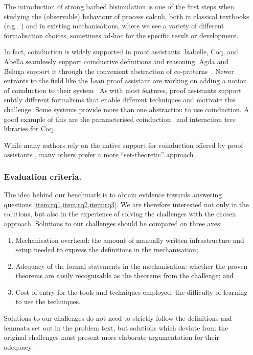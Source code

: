 \documentclass[runningheads]{llncs}
\begin{document}
The introduction of strong barbed bisimulation is one of the first
steps when studying the (observable) behaviour of process calculi,
both in classical textbooks (e.g., \cite{picalcbook}) and in existing
mechanisations, where we see a variety of different formalisation
choices, sometimes ad-hoc for the specific result or development.

In fact, coinduction is widely supported in proof assistants.
Isabelle, Coq, and Abella seamlessly support coinductive definitions and reasoning.
Agda and Beluga support it through the convenient abstraction of co-patterns~\cite{Abel2013}.
Newer entrants to the field like the Lean proof assistant
are working on adding a notion of coinduction to their system~\cite{Avigad2019}%
%
As with most features, proof assistants support
subtly different formalisms that enable different techniques and motivate this challenge.
Some systems provide more than one abstraction to use coinduction.
A good example of this are the parameterised coinduction~\cite{Hur2013}
and interaction tree~\cite{Xia2019} libraries for Coq.


While many authors rely on the native support for coinduction offered
by proof assistants
\cite{Honsell2001,Bengtson2016,Kahsai2008,Thiemann2019,Gay2020}, many
others prefer a more ``set-theoretic'' approach
\cite{Hirschkoff1997,Bengtson2009,Maksimovic2015,Pohjola2022}.

\subsubsection{Evaluation criteria.}
The idea behind our benchmark is to obtain evidence towards answering
questions \cref{item:rq1,item:rq2,item:rq3}. We are therefore
interested not only in the solutions, but also in the experience of
solving the challenges with the chosen approach.  Solutions to our
challenges should be compared on three axes:
\begin{enumerate}
\item Mechanisation overhead: the amount of manually written infrastructure and setup needed to express the definitions in the mechanisation;
\item Adequacy of the formal statements in the mechanisation: whether the proven theorems are easily recognisable as the theorems from the challenge; and
\item Cost of entry for the tools and techniques employed: the difficulty of learning to use the techniques.
\end{enumerate}
Solutions to our challenges do not need to strictly follow the definitions and lemmata set out in the problem text, but solutions which deviate from the original challenges must present more elaborate argumentation for their adequacy.
\end{document}
